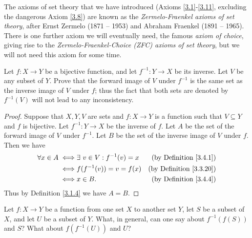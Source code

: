 \setcounter{theorem}{11}
\begin{remark}\label{3.4.12}
    The axioms of set theory that we have introduced (Axioms \ref{3.1}-\ref{3.11}, excluding the dangerous Axiom \ref{3.8}) are known as the \emph{Zermelo-Fraenkel axioms of set theory}, after Ernst Zermelo (1871 -- 1953) and Abraham Fraenkel (1891 -- 1965).
    There is one further axiom we will eventually need, the famous \emph{axiom of choice}, giving rise to the \emph{Zermelo-Fraenkel-Choice (ZFC) axioms of set theory}, but we will not need this axiom for some time.
\end{remark}

\exercisesection

\begin{exercise}\label{ex 3.4.1}
    Let \(f : X \to Y\) be a bijective function, and let \(f^{-1} : Y \to X\) be its inverse.
    Let \(V\) be any subset of \(Y\).
    Prove that the forward image of \(V\) under \(f^{-1}\) is the same set as the inverse image of \(V\) under \(f\);
    thus the fact that both sets are denoted by \(f^{-1}(V)\) will not lead to any inconsistency.
\end{exercise}

\begin{proof}
    Suppose that \(X, Y, V\) are sets and \(f : X \to Y\) is a function such that \(V \subseteq Y\) and \(f\) is bijective.
    Let \(f^{-1} : Y \to X\) be the inverse of \(f\).
    Let \(A\) be the set of the forward image of \(V\) under \(f^{-1}\).
    Let \(B\) be the set of the inverse image of \(V\) under \(f\).
    Then we have
    \begin{align*}
        \forall x \in A \iff & \exists\ v \in V : f^{-1}(v) = x & \text{(by Definition \ref{3.4.1})}  \\
        \iff                 & f(f^{-1}(v)) = v = f(x)          & \text{(by Definition \ref{3.3.20})} \\
        \iff                 & x \in B.                         & \text{(by Definition \ref{3.4.4})}
    \end{align*}
    Thus by Definition \ref{3.1.4} we have \(A = B\).
\end{proof}

\begin{exercise}\label{ex 3.4.2}
    Let \(f : X \to Y\) be a function from one set \(X\) to another set \(Y\), let \(S\) be a subset of \(X\), and let \(U\) be a subset of \(Y\).
    What, in general, can one say about \(f^{-1}(f(S))\) and \(S\)?
    What about \(f(f^{-1}(U))\) and \(U\)?
\end{exercise}

